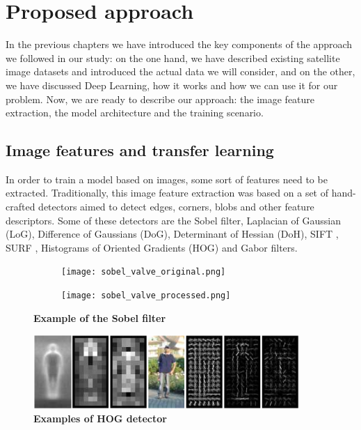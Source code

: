 
\chapter{Proposed approach}

\label{Chapter4}


In the previous chapters we have introduced the key components of the approach we followed in our study: on the one hand, we have described existing satellite image datasets and introduced the actual data we will consider, and on the other, we have discussed Deep Learning, how it works and how we can use it for our problem. Now, we are ready to describe our approach: the image feature extraction, the model architecture and the training scenario.

\section{Image features and transfer learning}\label{sec:transferLearning}

In order to train a model based on images, some sort of features need to be extracted. Traditionally, this image feature extraction was based on a set of hand-crafted detectors aimed to detect edges, corners, blobs and other feature descriptors. Some of these detectors are the Sobel filter, Laplacian of Gaussian (LoG), Difference of Gaussians (DoG), Determinant of Hessian (DoH), SIFT \parencite{Lowe1999,Lowe2004}, SURF \parencite{Bay2006}, Histograms of Oriented Gradients (HOG) \parencite{Dalal2005} and Gabor filters.

\begin{figure}[h!]
	\centering
	\begin{subfigure}{.5\textwidth}
  		\centering
  		\texttt{[image: sobel\_valve\_original.png]}
	\end{subfigure}%
	\begin{subfigure}{.5\textwidth}
  		\centering
  		\texttt{[image: sobel\_valve\_processed.png]}
	\end{subfigure}
	\captionsetup{width=1\linewidth}
	\caption{\textbf{Example of the Sobel filter}}
	\label{fig:sobel}
\end{figure}

\begin{figure}[h!]
	\centering
	\includegraphics[width=0.9\textwidth]{Figures/hog_example.png}
	\captionsetup{width=1\linewidth}
	\caption{\textbf{Examples of HOG detector \parencite{Dalal2005}}}
	\label{fig:hog}
\end{figure}


